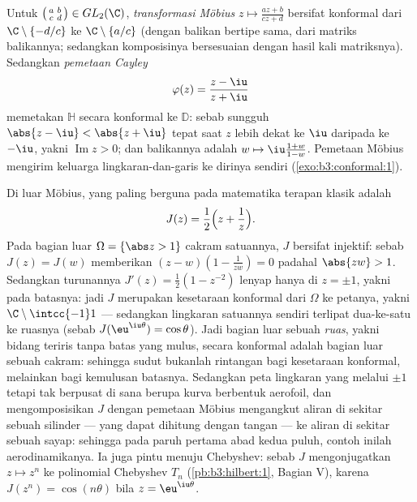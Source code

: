 \begin{example}
\label{ex:b3:conformal:mobius}
Untuk $\bigl(\begin{smallmatrix}a & b\\ c &
d\end{smallmatrix}\bigr) \in GL_2(\C)$, \emph{transformasi
Möbius} $z \mapsto
\frac{az + b}{cz + d}$ bersifat konformal dari
$\C\setminus\{-d/c\}$ ke $\C\setminus\{a/c\}$ (dengan balikan
bertipe sama, dari matriks balikannya; sedangkan komposisinya
bersesuaian dengan hasil kali matriksnya). Sedangkan \emph{pemetaan
Cayley}
\[
\varphi(z) = \frac{z - \iu}{z + \iu}
\]
memetakan $\mathbb H$ secara konformal ke $\mathbb D$: sebab sungguh $\abs{z
- \iu} < \abs{z + \iu}$ tepat saat $z$ lebih dekat ke $\iu$
daripada ke $-\iu$, yakni $\operatorname{Im}z > 0$; dan balikannya adalah
$w \mapsto \iu\frac{1 + w}{1 - w}$. Pemetaan Möbius mengirim
keluarga lingkaran-dan-garis ke dirinya sendiri (\cref{exo:b3:conformal:1}).
\end{example}

\begin{example}\label{ex:b3:conformal:joukowski}
Di luar Möbius,  yang paling berguna pada
matematika terapan klasik adalah
\[
J(z) = \frac12\Bigl(z + \frac1z\Bigr) .
\]
Pada bagian luar $\Omega = \{\abs z > 1\}$ cakram satuannya,
$J$ bersifat injektif: sebab $J(z) = J(w)$ memberikan $(z - w)(1 -
\frac1{zw}) = 0$ padahal $\abs{zw} > 1$. Sedangkan turunannya $J'(z) =
\frac12(1 - z^{-2})$ lenyap hanya di $z = \pm1$, yakni pada
batasnya: jadi $J$ merupakan kesetaraan konformal dari $\Omega$ ke
petanya, yakni $\C\setminus\intcc{-1}1$ --- sedangkan lingkaran
satuannya sendiri terlipat dua-ke-satu ke ruasnya
(sebab $J(\eu^{\iu\theta}) = \cos\theta$). Jadi bagian luar sebuah
\emph{ruas}, yakni bidang teriris tanpa batas yang mulus, secara
konformal adalah bagian luar sebuah cakram: sehingga sudut bukanlah rintangan
bagi kesetaraan konformal, melainkan bagi kemulusan batasnya. Sedangkan peta
lingkaran yang melalui $\pm1$ tetapi tak berpusat di sana berupa kurva
berbentuk aerofoil, dan mengomposisikan $J$ dengan pemetaan Möbius mengangkut
aliran di sekitar sebuah silinder --- yang dapat dihitung dengan tangan --- ke aliran
di sekitar sebuah sayap: sehingga pada paruh pertama abad kedua puluh,
contoh inilah aerodinamikanya. Ia juga pintu menuju
Chebyshev: sebab $J$ mengonjugatkan $z \mapsto z^n$ ke polinomial
Chebyshev $T_n$ (\cref{pb:b3:hilbert:1}, Bagian V), karena
$J(z^n) = \cos(n\theta)$ bila $z = \eu^{\iu\theta}$.
\end{example}

